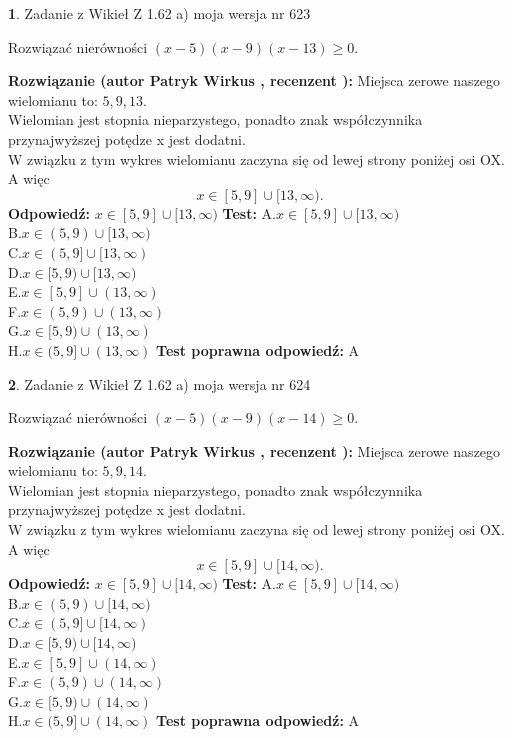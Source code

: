 \documentclass[12pt, a4paper]{article}
\theoremstyle{definition} %
\newtheorem{zad}{}
\newcommand{\zadStart}[1]{\begin{zad}#1\newline}
\newcommand{\zadStop}{\end{zad}}
\newcommand{\rozwStart}[2]{\noindent \textbf{Rozwiązanie (autor #1 , recenzent #2): }\newline}
\newcommand{\rozwStop}{\newline}
\newcommand{\odpStart}{\noindent \textbf{Odpowiedź:}\newline}
\newcommand{\odpStop}{\newline}
\newcommand{\testStart}{\noindent \textbf{Test:}\newline}
\newcommand{\testStop}{\newline}
\newcommand{\kluczStart}{\noindent \textbf{Test poprawna odpowiedź:}\newline}
\newcommand{\kluczStop}{\newline}
\begin{document}
\zadStart{Zadanie z Wikieł Z 1.62 a) moja wersja nr 623}

Rozwiązać nierówności $(x-5)(x-9)(x-13)\ge0$.
\zadStop
\rozwStart{Patryk Wirkus}{}
Miejsca zerowe naszego wielomianu to: $5, 9, 13$.\\
Wielomian jest stopnia nieparzystego, ponadto znak współczynnika przy\linebreak najwyższej potędze x jest dodatni.\\ W związku z tym wykres wielomianu zaczyna się od lewej strony poniżej osi OX. A więc $$x \in [5,9] \cup [13,\infty).$$
\rozwStop
\odpStart
$x \in [5,9] \cup [13,\infty)$
\odpStop
\testStart
A.$x \in [5,9] \cup [13,\infty)$\\
B.$x \in (5,9) \cup [13,\infty)$\\
C.$x \in (5,9] \cup [13,\infty)$\\
D.$x \in [5,9) \cup [13,\infty)$\\
E.$x \in [5,9] \cup (13,\infty)$\\
F.$x \in (5,9) \cup (13,\infty)$\\
G.$x \in [5,9) \cup (13,\infty)$\\
H.$x \in (5,9] \cup (13,\infty)$
\testStop
\kluczStart
A
\kluczStop



\zadStart{Zadanie z Wikieł Z 1.62 a) moja wersja nr 624}

Rozwiązać nierówności $(x-5)(x-9)(x-14)\ge0$.
\zadStop
\rozwStart{Patryk Wirkus}{}
Miejsca zerowe naszego wielomianu to: $5, 9, 14$.\\
Wielomian jest stopnia nieparzystego, ponadto znak współczynnika przy\linebreak najwyższej potędze x jest dodatni.\\ W związku z tym wykres wielomianu zaczyna się od lewej strony poniżej osi OX. A więc $$x \in [5,9] \cup [14,\infty).$$
\rozwStop
\odpStart
$x \in [5,9] \cup [14,\infty)$
\odpStop
\testStart
A.$x \in [5,9] \cup [14,\infty)$\\
B.$x \in (5,9) \cup [14,\infty)$\\
C.$x \in (5,9] \cup [14,\infty)$\\
D.$x \in [5,9) \cup [14,\infty)$\\
E.$x \in [5,9] \cup (14,\infty)$\\
F.$x \in (5,9) \cup (14,\infty)$\\
G.$x \in [5,9) \cup (14,\infty)$\\
H.$x \in (5,9] \cup (14,\infty)$
\testStop
\kluczStart
A
\kluczStop
\end{document}

